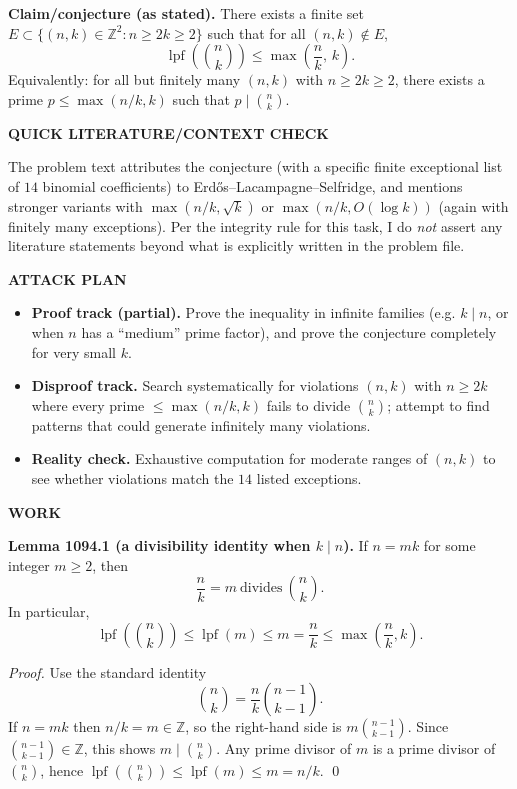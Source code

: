 \smallskip
\noindent
\textbf{Claim/conjecture (as stated).}
There exists a finite set $E\subset\{(n,k)\in\mathbb{Z}^2: n\ge 2k\ge 2\}$ such that for all $(n,k)\notin E$,
\[
\operatorname{lpf}\!\left(\binom{n}{k}\right)\le \max\left(\frac{n}{k},\,k\right).
\]
Equivalently: for all but finitely many $(n,k)$ with $n\ge 2k\ge 2$, there exists a prime $p\le \max(n/k,k)$ such that $p\mid\binom{n}{k}$.

\medskip
\noindent\textbf{QUICK LITERATURE/CONTEXT CHECK}

\smallskip
\noindent
The problem text attributes the conjecture (with a specific finite exceptional list of $14$ binomial coefficients) to Erd\H{o}s--Lacampagne--Selfridge, and mentions stronger variants with $\max(n/k,\sqrt{k})$ or $\max(n/k,O(\log k))$ (again with finitely many exceptions). Per the integrity rule for this task, I do \emph{not} assert any literature statements beyond what is explicitly written in the problem file.

\medskip
\noindent\textbf{ATTACK PLAN}

\smallskip
\noindent
\begin{itemize}
\item \textbf{Proof track (partial).} Prove the inequality in infinite families (e.g. $k\mid n$, or when $n$ has a ``medium'' prime factor), and prove the conjecture completely for very small $k$.
\item \textbf{Disproof track.} Search systematically for violations $(n,k)$ with $n\ge 2k$ where every prime $\le\max(n/k,k)$ fails to divide $\binom{n}{k}$; attempt to find patterns that could generate infinitely many violations.
\item \textbf{Reality check.} Exhaustive computation for moderate ranges of $(n,k)$ to see whether violations match the $14$ listed exceptions.
\end{itemize}

\medskip
\noindent\textbf{WORK}

\smallskip
\noindent\textbf{Lemma 1094.1 (a divisibility identity when $k\mid n$).}
If $n=mk$ for some integer $m\ge 2$, then
\[
\frac{n}{k}=m\ \text{divides}\ \binom{n}{k}.
\]
In particular,
\[
\operatorname{lpf}\!\left(\binom{n}{k}\right)\le \operatorname{lpf}(m)\le m=\frac{n}{k}\le \max\left(\frac{n}{k},k\right).
\]

\smallskip
\noindent\emph{Proof.}
Use the standard identity
\[
\binom{n}{k}=\frac{n}{k}\binom{n-1}{k-1}.
\]
If $n=mk$ then $n/k=m\in\mathbb{Z}$, so the right-hand side is $m\binom{n-1}{k-1}$. Since $\binom{n-1}{k-1}\in\mathbb{Z}$, this shows $m\mid\binom{n}{k}$. Any prime divisor of $m$ is a prime divisor of $\binom{n}{k}$, hence $\operatorname{lpf}(\binom{n}{k})\le \operatorname{lpf}(m)\le m=n/k$. \qed


